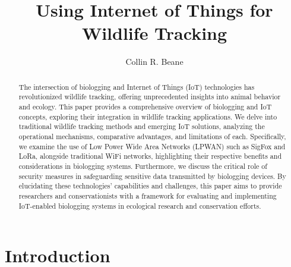\documentclass[sigplan,screen,nonacm]{acmart}
\begin{document}
\title[IoT for Wildlife Tracking]{Using Internet of Things for Wildlife Tracking}

\author{Collin R. Beane}

\begin{abstract}
  The intersection of biologging and Internet of Things (IoT) technologies has revolutionized wildlife tracking, 
  offering unprecedented insights into animal behavior and ecology. This paper provides a comprehensive overview 
  of biologging and IoT concepts, exploring their integration in wildlife tracking applications. We delve into 
  traditional wildlife tracking methods and emerging IoT solutions, analyzing the operational mechanisms, comparative 
  advantages, and limitations of each. Specifically, we examine the use of Low Power Wide Area Networks (LPWAN) such 
  as SigFox and LoRa, alongside traditional WiFi networks, highlighting their respective benefits and considerations 
  in biologging systems. Furthermore, we discuss the critical role of security measures in safeguarding sensitive data 
  transmitted by biologging devices. By elucidating these technologies' capabilities and challenges, this paper aims 
  to provide researchers and conservationists with a framework for evaluating and implementing IoT-enabled biologging 
  systems in ecological research and conservation efforts.
\end{abstract}

\doclicenseThis



\maketitle

\section{Introduction}
\label{sec:introduction}
\end{document}
